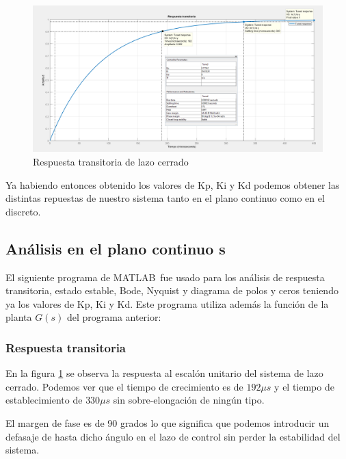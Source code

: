 \documentclass[12pt]{report}
\begin{document}
	\begin{figure}
		\centering
		\includegraphics[width=\textwidth,height=\textheight,keepaspectratio]{buck_step_response} 
		\caption{Respuesta transitoria de lazo cerrado}
		\label{buck:settling_time}
	\end{figure}

	\newpage
	Ya habiendo entonces obtenido los valores de Kp, Ki y Kd podemos obtener las distintas repuestas de nuestro sistema tanto en el plano continuo como en el discreto.

	\subsection{Análisis en el plano continuo s}
	
	El siguiente programa de MATLAB\textregistered \ fue usado para los análisis de respuesta transitoria, estado estable, Bode, Nyquist y diagrama de polos y ceros teniendo ya los valores de Kp, Ki y Kd. Este programa utiliza además la función de la planta $G(s)$ del programa anterior:
	
	
	
	\subsubsection{Respuesta transitoria}
	
	En la figura \ref{buck:settling_time} se observa la respuesta al escalón unitario del sistema de lazo cerrado. Podemos ver que el tiempo de crecimiento es de $192 \mu s$ y el tiempo de establecimiento de $330 \mu s$ sin sobre-elongación de ningún tipo. 
	
	El margen de fase es de 90 grados lo que significa que podemos introducir un defasaje de hasta dicho ángulo en el lazo de control sin perder la estabilidad del sistema.
	
\end{document}
